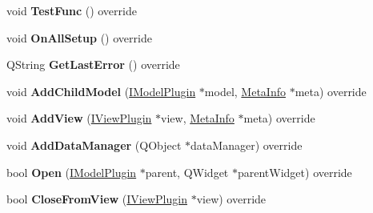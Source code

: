 \begin{DoxyCompactItemize}
\item 
void {\bfseries Test\+Func} () override\hypertarget{class_neural_network_model_a81bbe391734aa26a7fa316dcbea0ea86}{}\label{class_neural_network_model_a81bbe391734aa26a7fa316dcbea0ea86}

\item 
void {\bfseries On\+All\+Setup} () override\hypertarget{class_neural_network_model_ae10c5a6387aa0752663d4c0ee07ed5ca}{}\label{class_neural_network_model_ae10c5a6387aa0752663d4c0ee07ed5ca}

\item 
Q\+String {\bfseries Get\+Last\+Error} () override\hypertarget{class_neural_network_model_ab9c3d8c5d6ae87dc0ed6e0650e614eb3}{}\label{class_neural_network_model_ab9c3d8c5d6ae87dc0ed6e0650e614eb3}

\item 
void {\bfseries Add\+Child\+Model} (\hyperlink{class_i_model_plugin}{I\+Model\+Plugin} $\ast$model, \hyperlink{struct_meta_info}{Meta\+Info} $\ast$meta) override\hypertarget{class_neural_network_model_a76c4f2032b0bc283e59efcf90617ca45}{}\label{class_neural_network_model_a76c4f2032b0bc283e59efcf90617ca45}

\item 
void {\bfseries Add\+View} (\hyperlink{class_i_view_plugin}{I\+View\+Plugin} $\ast$view, \hyperlink{struct_meta_info}{Meta\+Info} $\ast$meta) override\hypertarget{class_neural_network_model_ab819ce176d4dd2d2709b4db3304db5ef}{}\label{class_neural_network_model_ab819ce176d4dd2d2709b4db3304db5ef}

\item 
void {\bfseries Add\+Data\+Manager} (Q\+Object $\ast$data\+Manager) override\hypertarget{class_neural_network_model_ad20c25a3b27c40fbb448997adbf35e72}{}\label{class_neural_network_model_ad20c25a3b27c40fbb448997adbf35e72}

\item 
bool {\bfseries Open} (\hyperlink{class_i_model_plugin}{I\+Model\+Plugin} $\ast$parent, Q\+Widget $\ast$parent\+Widget) override\hypertarget{class_neural_network_model_ac6fcccae5d54c0fd16bc5e645dff04b7}{}\label{class_neural_network_model_ac6fcccae5d54c0fd16bc5e645dff04b7}

\item 
bool {\bfseries Close\+From\+View} (\hyperlink{class_i_view_plugin}{I\+View\+Plugin} $\ast$view) override\hypertarget{class_neural_network_model_ac66bbc3e734af35989a83ff95d45d894}{}\label{class_neural_network_model_ac66bbc3e734af35989a83ff95d45d894}


\end{DoxyCompactItemize}
